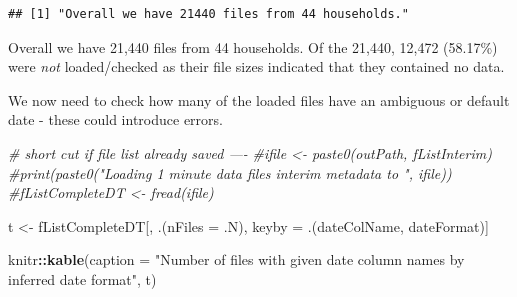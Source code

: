 \documentclass[]{article}
\newenvironment{Shaded}{\begin{snugshade}}{\end{snugshade}}
\newcommand{\KeywordTok}[1]{\textcolor[rgb]{0.13,0.29,0.53}{\textbf{#1}}}
\newcommand{\DataTypeTok}[1]{\textcolor[rgb]{0.13,0.29,0.53}{#1}}
\newcommand{\StringTok}[1]{\textcolor[rgb]{0.31,0.60,0.02}{#1}}
\newcommand{\CommentTok}[1]{\textcolor[rgb]{0.56,0.35,0.01}{\textit{#1}}}
\newcommand{\OperatorTok}[1]{\textcolor[rgb]{0.81,0.36,0.00}{\textbf{#1}}}
\newcommand{\NormalTok}[1]{#1}
\begin{document}
\begin{Shaded}
\end{Shaded}

\begin{verbatim}
## [1] "Overall we have 21440 files from 44 households."
\end{verbatim}

\begin{Shaded}
\end{Shaded}

Overall we have 21,440 files from 44 households. Of the 21,440, 12,472
(58.17\%) were \emph{not} loaded/checked as their file sizes indicated
that they contained no data.

We now need to check how many of the loaded files have an ambiguous or
default date - these could introduce errors.

\begin{Shaded}
\begin{Highlighting}[]
\CommentTok{# short cut if file list already saved ----}
\CommentTok{#ifile <- paste0(outPath, fListInterim)}
\CommentTok{#print(paste0("Loading 1 minute data files interim metadata to ", ifile))}
\CommentTok{#fListCompleteDT <- fread(ifile)}
  
  
\NormalTok{t <-}\StringTok{ }\NormalTok{fListCompleteDT[, .(}\DataTypeTok{nFiles =}\NormalTok{ .N), keyby =}\StringTok{ }\NormalTok{.(dateColName, dateFormat)]}

\NormalTok{knitr}\OperatorTok{::}\KeywordTok{kable}\NormalTok{(}\DataTypeTok{caption =} \StringTok{"Number of files with given date column names by inferred date format"}\NormalTok{, t)}
\end{Highlighting}
\end{Shaded}
\end{document}
